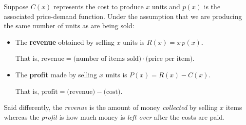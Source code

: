 \colorbox{ResultColor}{\bbm

\begin{defn}  Suppose $C(x)$ represents the cost to produce $x$ units and $p(x)$ is the associated price-demand function.  Under the assumption that we are producing the same number of units as are being sold: \label{revenueprofitdefns}   

\begin{itemize}

\item The  \textbf{revenue} obtained by selling $x$ units is $R(x) = x \, p(x)$.

That is, $\text{revenue} = \text{(number of items sold)} \cdot \text{(price per item)}.$

\item The  \textbf{profit} made by selling $x$ units is $P(x) = R(x) - C(x)$.

That is, $\text{profit} = \text{(revenue)}  - \text{(cost)}.$

\end{itemize}

\end{defn}

\ebm}

\medskip

Said differently, the \textit{revenue} is the amount of money \textit{collected} by selling $x$ items whereas the \textit{profit} is how much money is \textit{left over} after the costs are paid.
 
